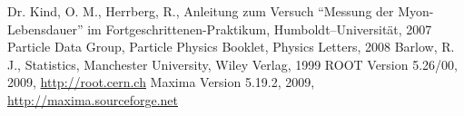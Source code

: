 \renewcommand{\refname}{Literatur und Programme}
\begin{thebibliography}{xxxxxx}
Dr. Kind, O. M., Herrberg, R., Anleitung zum Versuch ``Messung der
Myon-Lebensdauer'' im
Fortgeschrittenen-Praktikum, Humboldt–Universität, 2007
Particle Data Group, Particle Physics Booklet, Physics Letters, 2008
Barlow, R. J., Statistics, Manchester University, Wiley Verlag, 1999
ROOT Version 5.26/00, 2009, \href{http://root.cern.ch}{http://root.cern.ch}
Maxima Version 5.19.2, 2009, \href{http://maxima.sourceforge.net}{http://maxima.sourceforge.net}
\end{thebibliography}